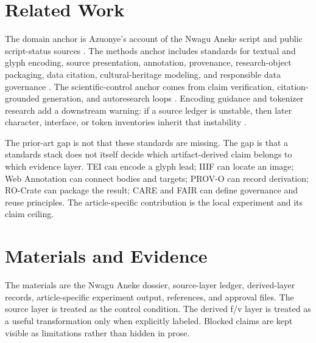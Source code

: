 \documentclass[sigconf,nonacm]{acmart}
\begin{document}
\section{Related Work}
The domain anchor is Azuonye's account of the Nwagu Aneke script and public
script-status sources \cite{azuonye1992,omniglotNwagu,unicodeAfricanScripts2023,scriptSourceNwagu,sirisNwaguProposal}.
The methods anchor includes standards for textual and glyph encoding, source
presentation, annotation, provenance, research-object packaging, data citation,
cultural-heritage modeling, and responsible data governance \cite{azuonye1992,omniglotNwagu,unicodeAfricanScripts2023,scriptSourceNwagu,sirisNwaguProposal,teiP5Glyphs,iiifPresentation3,w3cAnnotationModel,w3cAnnotationVocab,w3cProvO,rocrate12,cidocCrm,datacite45,wilkinson2016fair,carroll2020care,wadden2020scifact,gao2023alce,karpathyAutoresearch,acmSubmissions,arxivSubmitTex}.
The scientific-control anchor comes from claim verification, citation-grounded
generation, and autoresearch loops \cite{wadden2020scifact,gao2023alce,karpathyAutoresearch}.
Encoding guidance and tokenizer research add a downstream warning: if a source
ledger is unstable, then later character, interface, or token inventories inherit
that instability \cite{seiProposalTips,sennrich2016bpe,kudo2018sentencepiece,bostrom2020bytepair,rust2021tokenization}.

The prior-art gap is not that these standards are missing. The gap is that a
standards stack does not itself decide which artifact-derived claim belongs to
which evidence layer. TEI can encode a glyph lead; IIIF can locate an image;
Web Annotation can connect bodies and targets; PROV-O can record derivation;
RO-Crate can package the result; CARE and FAIR can define governance and reuse
principles. The article-specific contribution is the local experiment and its
claim ceiling.

\section{Materials and Evidence}
The materials are the Nwagu Aneke dossier, source-layer ledger, derived-layer
records, article-specific experiment output, references, and approval files.
The source layer is treated as the control condition. The derived f/v layer is
treated as a useful transformation only when explicitly labeled. Blocked claims
are kept visible as limitations rather than hidden in prose.
\end{document}
